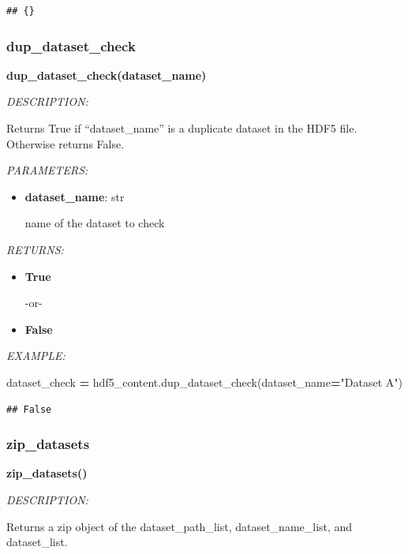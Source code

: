 \documentclass[
]{article}
\newenvironment{Shaded}{\begin{snugshade}}{\end{snugshade}}
\newcommand{\NormalTok}[1]{#1}
\newcommand{\OperatorTok}[1]{\textcolor[rgb]{0.81,0.36,0.00}{\textbf{#1}}}
\newcommand{\StringTok}[1]{\textcolor[rgb]{0.31,0.60,0.02}{#1}}
\begin{document}
\begin{verbatim}
## {}
\end{verbatim}

\hypertarget{dup_dataset_check}{%
\subsubsection{dup\_dataset\_check}\label{dup_dataset_check}}

\textbf{dup\_dataset\_check(dataset\_name)}

\emph{DESCRIPTION:}

Returns True if ``dataset\_name'' is a duplicate dataset in the HDF5 file. Otherwise returns False.

\emph{PARAMETERS:}

\begin{itemize}
\item
  \textbf{dataset\_name}: str

  name of the dataset to check
\end{itemize}

\emph{RETURNS:}

\begin{itemize}
\item
  \textbf{True}

  -or-
\item
  \textbf{False}
\end{itemize}

\emph{EXAMPLE:}

\begin{Shaded}
\begin{Highlighting}[]
\NormalTok{dataset_check }\OperatorTok{=}\NormalTok{ hdf5_content.dup_dataset_check(dataset_name}\OperatorTok{=}\StringTok{"Dataset A"}\NormalTok{)}
\end{Highlighting}
\end{Shaded}

\begin{verbatim}
## False
\end{verbatim}

\hypertarget{zip_datasets}{%
\subsubsection{zip\_datasets}\label{zip_datasets}}

\textbf{zip\_datasets()}

\emph{DESCRIPTION:}

Returns a zip object of the dataset\_path\_list, dataset\_name\_list, and dataset\_list.
\end{document}
